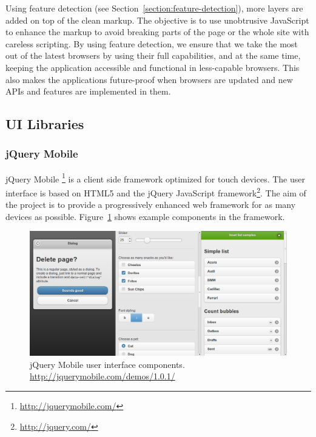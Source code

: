 Using feature detection (see Section~\ref{section:feature-detection}),
more layers are added on top of the clean markup. The objective is to
use unobtrusive JavaScript to enhance the markup to avoid breaking
parts of the page or the whole site with careless scripting. By using
feature detection, we ensure that we take the most out of the latest
browsers by using their full capabilities, and at the same time,
keeping the application accessible and functional in less-capable
browsers. This also makes the applications future-proof when browsers
are updated and new APIs and features are implemented in
them. \cite{parker2010designing}

\subsection{UI Libraries}

\subsubsection{jQuery Mobile}

jQuery Mobile \footnote{\url{http://jquerymobile.com/}} is a client
side framework optimized for touch devices. The user interface is
based on HTML5 and the jQuery JavaScript
framework\footnote{\url{http://jquery.com/}}. The aim of the project
is to provide a progressively enhanced web framework for as many
devices as possible. Figure~\ref{figure:jquerymobile.png} shows
example components in the framework.

\begin{figure}[ht]
  \begin{center}
    \includegraphics[width=\textwidth]{images/jquerymobile.png}
    \caption{jQuery Mobile user interface
      components. \url{http://jquerymobile.com/demos/1.0.1/}}
    \label{figure:jquerymobile.png}
  \end{center}
\end{figure}

